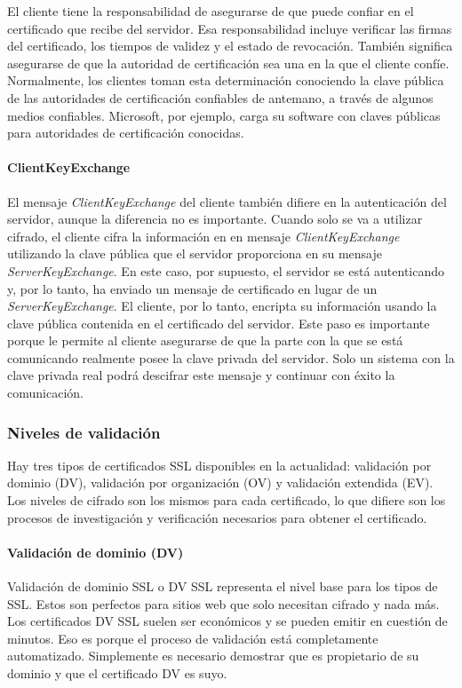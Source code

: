 El cliente tiene la responsabilidad de asegurarse de que puede confiar 
en el certificado que recibe del servidor. Esa responsabilidad incluye 
verificar las firmas del certificado, los tiempos de validez y el estado 
de revocación. También significa asegurarse de que la autoridad de 
certificación sea una en la que el cliente confíe. Normalmente, los clientes 
toman esta determinación conociendo la clave pública de las autoridades de 
certificación confiables de antemano, a través de algunos medios confiables. 
Microsoft, por ejemplo, carga su software con claves públicas para 
autoridades de certificación conocidas.

\paragraph*{ClientKeyExchange}
El mensaje \emph{ClientKeyExchange} del cliente también difiere en la autenticación 
del servidor, aunque la diferencia no es importante. Cuando solo se va a 
utilizar cifrado, el cliente cifra la información en en mensaje 
\emph{ClientKeyExchange}
utilizando la clave pública que el servidor proporciona en su mensaje 
\emph{ServerKeyExchange}. En este caso, por supuesto, el servidor se está 
autenticando y, por lo tanto, ha enviado un mensaje de certificado en 
lugar de un \emph{ServerKeyExchange}. El cliente, por lo tanto, encripta su 
información usando la clave pública contenida en el 
certificado del servidor. Este paso es importante porque le permite 
al cliente asegurarse de que la parte con la que se está comunicando 
realmente posee la clave privada del servidor. Solo un sistema con la 
clave privada real podrá descifrar este mensaje y continuar con éxito 
la comunicación.

 

\subsubsection*{Niveles de validación}  
Hay tres tipos de certificados SSL disponibles en la actualidad: validación por 
dominio (DV),
validación por organización (OV) y validación extendida (EV).
Los niveles de cifrado son los mismos para cada certificado, lo que difiere son los 
procesos de investigación y verificación necesarios para obtener el certificado.

\paragraph*{Validación de dominio (DV)}
Validación de dominio SSL o DV SSL representa el nivel base para los tipos de SSL. 
Estos son perfectos para sitios web que solo necesitan cifrado y nada más. Los 
certificados DV SSL suelen ser económicos y se pueden emitir en cuestión de minutos. 
Eso es porque el proceso de validación está completamente automatizado. Simplemente 
es necesario demostrar que es propietario de su dominio y que el certificado DV 
es suyo. 

